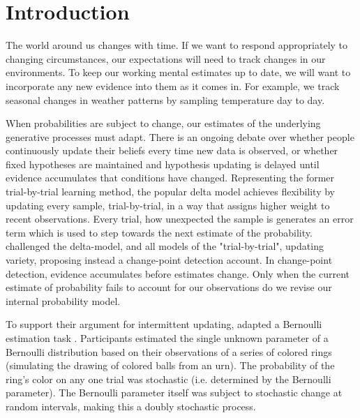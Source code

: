 \documentclass[sn-apa]{sn-jnl}\usepackage[]{graphicx}\usepackage[]{xcolor}
\begin{document}


\maketitle


\section{Introduction}\label{sec-intro}


The world around us changes with time. If we want to respond appropriately to changing circumstances, our expectations will need to track changes in our environments. To keep our working mental estimates up to date, we will want to incorporate any new evidence into them as it comes in. For example, we track seasonal changes in weather patterns by sampling temperature day to day. 

When probabilities are subject to change, our estimates of the underlying generative processes must adapt. There is an ongoing debate over whether people continuously update their beliefs every time new data is observed, or whether fixed hypotheses are maintained and hypothesis updating is delayed until evidence accumulates that conditions have changed. Representing the former trial-by-trial learning method, the popular delta model \citep{forsgren2023further,nassar2010,nassar2012,brown2009,krugel2009,steyvers2005} achieves flexibility by updating every sample, trial-by-trial, in a way that assigns higher weight to recent observations. Every trial, how unexpected the sample is generates an error term which is used to step towards the next estimate of the probability. \cite{gallistel2014} challenged the delta-model, and all models of the "trial-by-trial", updating variety, proposing instead a change-point detection account. In change-point detection, evidence accumulates before estimates change. Only when the current estimate of probability fails to account for our observations do we revise our internal probability model. 

To support their argument for intermittent updating, \cite{gallistel2014}  adapted a Bernoulli estimation task \citep{robinson1964}. Participants estimated the single unknown parameter of a Bernoulli distribution based on their observations of a series of colored rings (simulating the drawing of colored balls from an urn). The probability of the ring's color on any one trial was stochastic (i.e. determined by the Bernoulli parameter). The Bernoulli parameter itself was subject to stochastic change at random intervals, making this a doubly stochastic process.
\end{document}
